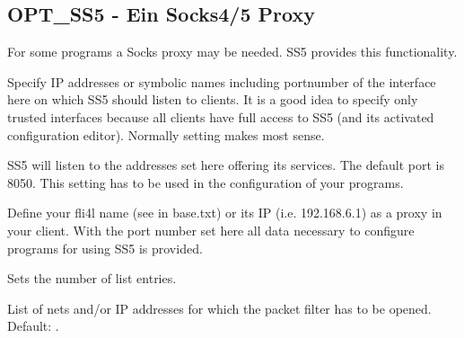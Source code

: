 \subsection{OPT\_SS5 - Ein Socks4/5 Proxy}

For some programs a Socks proxy may be needed. SS5 provides this
functionality.


\begin{description}



        {Specify IP addresses or symbolic names including portnumber of
        the interface here on which SS5 should listen to clients.
        It is a good idea to specify only trusted interfaces because
        all clients have full access to SS5 (and its activated
        configuration editor). Normally setting 
        makes most sense.

        SS5 will listen to the addresses set here offering its
        services. The default port is 8050. This setting has to be used
        in the configuration of your programs.

        Define your fli4l name (see  in base.txt) or its
        IP (i.e. 192.168.6.1) as a proxy in your client. With the port
        number set here all data necessary to configure programs
        for using SS5 is provided.}


        {Sets the number of list entries.}


        List of nets and/or IP addresses for which the packet filter
        has to be opened. Default: .

\end{description}
